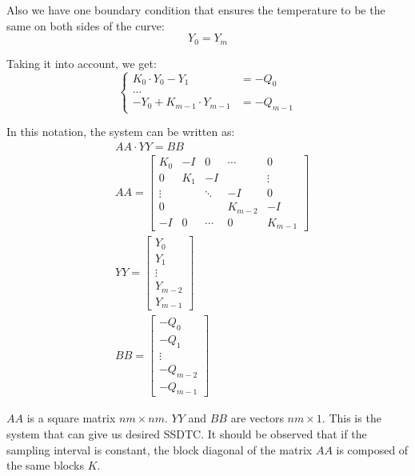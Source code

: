 Also we have one boundary condition that ensures the temperature to be the same on both sides of the curve:
\begin{equation} \label{eq:boundary-condition}
  Y_0 = Y_m
\end{equation}

Taking it into account, we get:
\[
  \begin{cases}
    K_0 \cdot Y_0 - Y_1 & =-Q_0 \\
    ... \\
    -Y_0 + K_{m-1} \cdot Y_{m-1} & = -Q_{m-1}
  \end{cases}
\]

In this notation, the system can be written as:
\begin{align}
  & AA \cdot YY = BB \label{eq:system} \\
  & AA = \left[
    \begin{array}{ccccc}
      K_0 & -I & 0 & \cdots & 0 \\
      0 & K_1 & -I &  & \vdots \\
      \vdots &  & \ddots & -I & 0 \\
      0 &  &  & K_{m-2} & -I \\
      -I & 0 & \cdots & 0 & K_{m-1}
    \end{array}
  \right] \nonumber \\
  & YY = \left[
    \begin{array}{c}
      Y_0 \\
      Y_1 \\
      \vdots \\
      Y_{m-2} \\
      Y_{m-1}
    \end{array}
  \right] \nonumber \\
  & BB = \left[
    \begin{array}{c}
      -Q_0 \\
      -Q_1 \\
      \vdots \\
      -Q_{m-2} \\
      -Q_{m-1}
    \end{array}
  \right] \nonumber
\end{align}

$AA$ is a square matrix $nm \times nm$. $YY$ and $BB$ are vectors $nm \times 1$. This is the system that can give us desired SSDTC. It should be observed that if the sampling interval is constant, the block diagonal of the matrix $AA$ is composed of the same blocks $K$.

